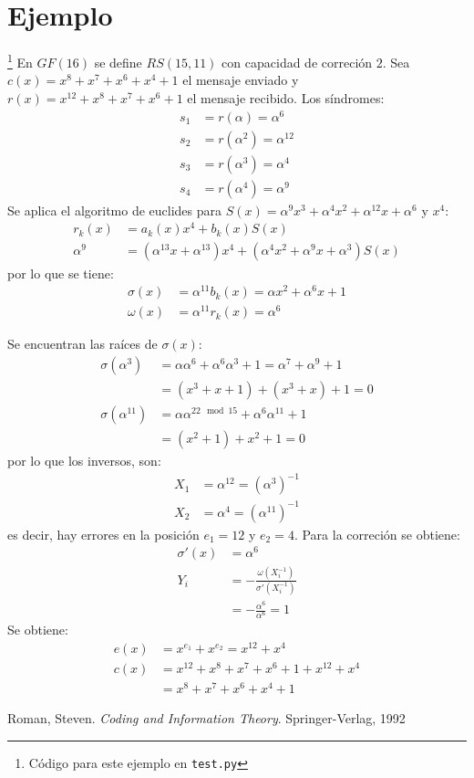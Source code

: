 \documentclass[12pt]{article}
\begin{document}
\section{Ejemplo}\footnote{Código para este ejemplo en \texttt{test.py}}
En $GF(16)$ se define $RS(15, 11)$ con capacidad de correción $2$.
Sea $c(x) = x^8 + x^7 + x^6 + x^4 + 1$ el mensaje enviado y $r(x) = x^{12} + x^8 + x^7  + x^6 + 1$ el mensaje recibido.
Los síndromes:
\begin{align*}
s_1 &= r(\alpha) = \alpha^6
\\s_2 &= r(\alpha^2) = \alpha^{12}
\\s_3 &= r(\alpha^3) = \alpha^4
\\s_4 &= r(\alpha^4) = \alpha^9
\end{align*}
Se aplica el algoritmo de euclides para $S(x) = \alpha^9 x^3 + \alpha^4 x^2 + \alpha^{12}x + \alpha^6$ y $x^4$:
\begin{align*}
r_k(x) &= a_k(x) x^4 + b_k(x) S(x)
\\\alpha^9 &= (\alpha^{13} x + \alpha^{13})x^4 + (\alpha^4 x^2+ \alpha^9 x+ \alpha^3 ) S(x)
\end{align*}
por lo que se tiene:
\begin{align*}
\sigma (x) &= \alpha^{11} b_k(x) =\alpha x^2 + \alpha^6 x + 1
\\\omega (x) &= \alpha^{11} r_k(x) = \alpha^6
\end{align*}

Se encuentran las raíces de $\sigma (x)$:
\begin{align*}
\sigma (\alpha^3) &= \alpha\alpha^6 + \alpha^6\alpha^3 + 1 = \alpha^7 + \alpha^9 + 1  
\\ &= (x^3 + x + 1) + (x^3 + x) + 1 = 0
\\\sigma(\alpha^{11}) &= \alpha\alpha^{22 \mod 15} + \alpha^6\alpha^{11} + 1
\\ &= (x^2 + 1) + x^2 + 1 = 0
\end{align*}
por lo que los inversos, son:
\begin{align*}
X_1 &= \alpha^{12} = (\alpha^3)^{-1}
\\ X_2 &= \alpha^4 = (\alpha^{11})^{-1}
\end{align*}
es decir, hay errores en la posición $e_1 = 12$ y $e_2 = 4$. Para la correción se obtiene:
\begin{align*}
\sigma '(x) &= \alpha^6
\\Y_i &= - \frac{\omega(X_i^{-1})}{\sigma '(X_i^{-1})}
\\ &= - \frac{\alpha^6}{\alpha^6} = 1
\end{align*}
Se obtiene:
\begin{align*}
e(x) &= x^{e_1} + x^{e_2} = x^{12} + x^4
\\ c(x) &=  x^{12} + x^8 + x^7  + x^6 + 1 + x^{12} + x^4
\\ &= x^8 + x^7 + x^6 + x^4 + 1
\end{align*}


\begin{thebibliography}{1}
  Roman, Steven.
  \emph{Coding and Information Theory}.
  Springer-Verlag,
  1992
\end{thebibliography}
\end{document}
